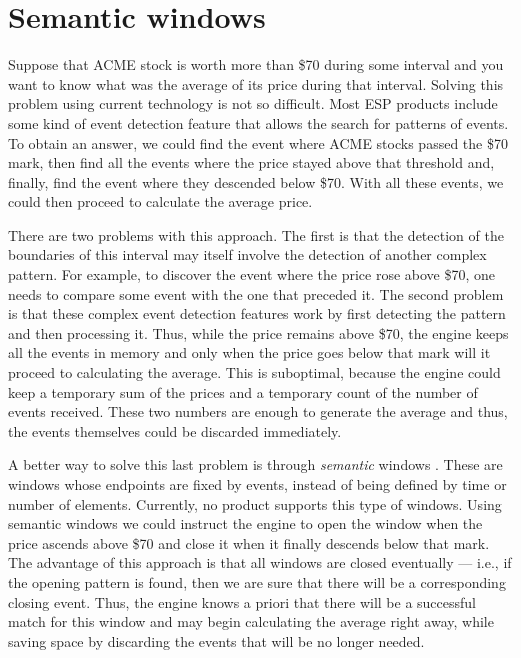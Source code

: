 \section{Semantic windows}
\label{sec:semantic-windows}

Suppose that ACME stock is worth more than \$70 during some interval
and you want to know what was the average of its price during that
interval. Solving this problem using current technology is not so
difficult. Most ESP products include some kind of event detection
feature that allows the search for patterns of events. To obtain an
answer, we could find the event where ACME stocks passed the \$70
mark, then find all the events where the price stayed above that
threshold and, finally, find the event where they descended below
\$70. With all these events, we could then proceed to calculate the
average price.

There are two problems with this approach. The first is that the
detection of the boundaries of this interval may itself involve the
detection of another complex pattern. For example, to discover the
event where the price rose above \$70, one needs to compare some event
with the one that preceded it. The second problem is that these
complex event detection features work by first detecting the pattern
and then processing it. Thus, while the price remains above \$70, the
engine keeps all the events in memory and only when the price goes
below that mark will it proceed to calculating the average. This is
suboptimal, because the engine could keep a temporary sum of the
prices and a temporary count of the number of events received. These
two numbers are enough to generate the average and thus, the events
themselves could be discarded immediately.

A better way to solve this last problem is through \emph{semantic}
windows \cite{semantic-windows}. These are windows whose endpoints are
fixed by events, instead of being defined by time or number of
elements. Currently, no product supports this type of windows. Using
semantic windows we could instruct the engine to open the window when
the price ascends above \$70 and close it when it finally descends
below that mark. The advantage of this approach is that all windows
are closed eventually --- i.e., if the opening pattern is found, then
we are sure that there will be a corresponding closing event. Thus,
the engine knows a priori that there will be a successful match for
this window and may begin calculating the average right away, while
saving space by discarding the events that will be no longer needed.

